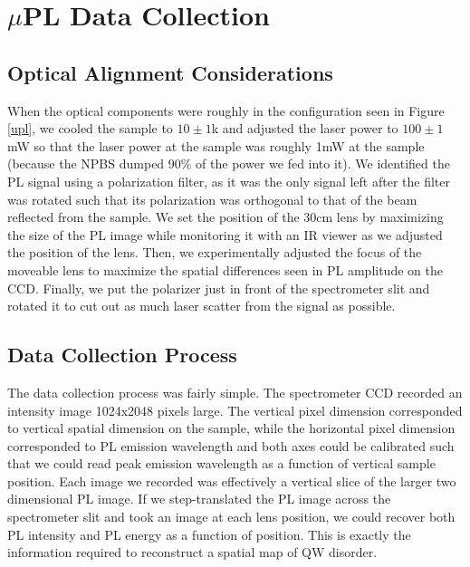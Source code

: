 \section{$\mu$PL Data Collection}
\subsection{Optical Alignment Considerations}
\indent When the optical components were roughly in the configuration seen in Figure \ref{upl}, we cooled the sample to $10\pm1$k and adjusted the laser power to $100\pm1$mW so that the laser power at the sample was roughly 1mW at the sample (because the NPBS dumped 90\% of the power we fed into it). We identified the PL signal using a polarization filter, as it was the only signal left after the filter was rotated such that its polarization was orthogonal to that of the beam reflected from the sample. We set the position of the 30cm lens by maximizing the size of the PL image while monitoring it with an IR viewer as we adjusted the position of the lens. Then, we experimentally adjusted the focus of the moveable lens to maximize the spatial differences seen in PL amplitude on the CCD. Finally, we put the polarizer just in front of the spectrometer slit and rotated it to cut out as much laser scatter from the signal as possible.

\subsection{Data Collection Process}
\indent The data collection process was fairly simple. The spectrometer CCD recorded an intensity image 1024x2048 pixels large. The vertical pixel dimension corresponded to vertical spatial dimension on the sample, while the horizontal pixel dimension corresponded to PL emission wavelength and both axes could be calibrated such that we could read peak emission wavelength as a function of vertical sample position. Each image we recorded was effectively a vertical slice of the larger two dimensional PL image. If we step-translated the PL image across the spectrometer slit and took an image at each lens position, we could recover both PL intensity and PL energy as a function of position. This is exactly the information required to reconstruct a spatial map of QW disorder. 

